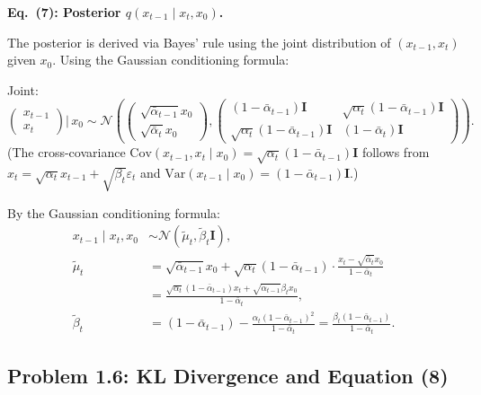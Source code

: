 \documentclass[11pt]{article}
\newcommand{\N}{\mathcal{N}}
\newcommand{\abar}{\bar{\alpha}}
\begin{document}
\textbf{Eq.~(7): Posterior $q(x_{t-1}\mid x_t,x_0)$.}

The posterior is derived via Bayes' rule using the joint distribution of
$(x_{t-1}, x_t)$ given $x_0$. Using the Gaussian conditioning formula:

Joint:
\[
\begin{pmatrix}x_{t-1}\\x_t\end{pmatrix}\bigg\vert\, x_0
\sim \N\!\left(
  \begin{pmatrix}\sqrt{\abar_{t-1}}x_0\\\sqrt{\abar_t}x_0\end{pmatrix},
  \begin{pmatrix}(1-\abar_{t-1})\mathbf{I} & \sqrt{\alpha_t}(1-\abar_{t-1})\mathbf{I}\\
                \sqrt{\alpha_t}(1-\abar_{t-1})\mathbf{I} & (1-\abar_t)\mathbf{I}\end{pmatrix}
\right).
\]
(The cross-covariance $\mathrm{Cov}(x_{t-1},x_t\mid x_0) = \sqrt{\alpha_t}(1-\abar_{t-1})\mathbf{I}$
follows from $x_t = \sqrt{\alpha_t}x_{t-1}+\sqrt{\beta_t}\varepsilon_t$
and $\mathrm{Var}(x_{t-1}\mid x_0)=(1-\abar_{t-1})\mathbf{I}$.)

By the Gaussian conditioning formula:
\begin{align*}
x_{t-1}\mid x_t, x_0 &\sim \N(\tilde\mu_t,\tilde\beta_t\mathbf{I}),\\
\tilde\mu_t &= \sqrt{\abar_{t-1}}x_0 + \sqrt{\alpha_t}(1-\abar_{t-1})\cdot
              \frac{x_t - \sqrt{\abar_t}x_0}{1-\abar_t}\\
            &= \frac{\sqrt{\alpha_t}(1-\abar_{t-1})x_t + \sqrt{\abar_{t-1}}\beta_t x_0}{1-\abar_t},\\
\tilde\beta_t &= (1-\abar_{t-1}) - \frac{\alpha_t(1-\abar_{t-1})^2}{1-\abar_t}
              = \frac{\beta_t(1-\abar_{t-1})}{1-\abar_t}.
\end{align*}

\subsection{Problem 1.6: KL Divergence and Equation (8)}
\end{document}
